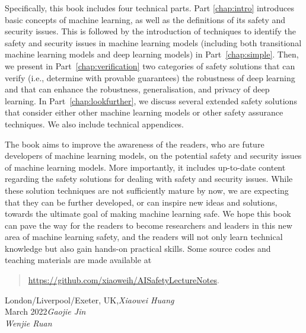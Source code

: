 Specifically, this book includes four technical parts. Part \ref{chap:intro} introduces basic concepts of machine learning, as well as the definitions of its safety and security issues. This is followed by the introduction of techniques to identify the safety and security issues in  machine learning models (including both transitional machine learning models and deep learning models) in Part~\ref{chap:simple}. Then, we present in Part~\ref{chap:verification} two categories of safety solutions that can verify (i.e., determine with provable guarantees) the robustness of deep learning  and that can enhance the robustness, generalisation, and privacy of deep learning. In Part~\ref{chap:lookfurther},
we discuss several extended safety solutions that consider either other machine learning models or other safety assurance techniques. We also include technical appendices. 



The book aims to improve the awareness of the readers, who are future developers of machine learning models, on the potential safety and security issues of machine learning models. More importantly, it includes up-to-date content regarding the safety solutions for dealing with safety and security issues. While these solution techniques are not sufficiently mature by now, we are expecting that they can be further developed, or can inspire new ideas and solutions, towards the ultimate goal of making machine learning safe. We hope this book can pave the way for the readers to become researchers and leaders in this new area of machine learning safety, and the readers will not only learn technical knowledge 
but also gain hands-on practical skills. Some source codes and teaching materials are made available at
\begin{quote}
    \url{https://github.com/xiaoweih/AISafetyLectureNotes}. 
\end{quote}


 

\vspace{\baselineskip}
\begin{flushright}\noindent
London/Liverpool/Exeter, UK,\hfill {\it Xiaowei Huang}\\
March 2022\hfill {\it Gaojie Jin}\\
\hfill {\it Wenjie Ruan}\\
\end{flushright}


